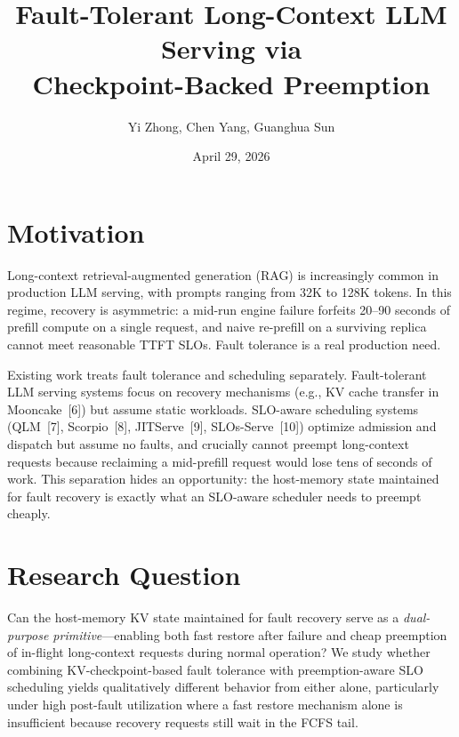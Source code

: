 \documentclass{article}
\title{Fault-Tolerant Long-Context LLM Serving via\\Checkpoint-Backed Preemption}
\author{Yi Zhong, Chen Yang, Guanghua Sun}
\date{April 29, 2026}
\begin{document}
\maketitle

\section*{Motivation}
Long-context retrieval-augmented generation (RAG) is increasingly common in production LLM serving, with prompts ranging from 32K to 128K tokens. In this regime, recovery is asymmetric: a mid-run engine failure forfeits 20--90 seconds of prefill compute on a single request, and naive re-prefill on a surviving replica cannot meet reasonable TTFT SLOs. Fault tolerance is a real production need.

Existing work treats fault tolerance and scheduling separately. Fault-tolerant LLM serving systems focus on recovery mechanisms (e.g., KV cache transfer in Mooncake~[6]) but assume static workloads. SLO-aware scheduling systems (QLM~[7], Scorpio~[8], JITServe~[9], SLOs-Serve~[10]) optimize admission and dispatch but assume no faults, and crucially cannot preempt long-context requests because reclaiming a mid-prefill request would lose tens of seconds of work. This separation hides an opportunity: the host-memory state maintained for fault recovery is exactly what an SLO-aware scheduler needs to preempt cheaply.

\section*{Research Question}
Can the host-memory KV state maintained for fault recovery serve as a \emph{dual-purpose primitive}---enabling both fast restore after failure and cheap preemption of in-flight long-context requests during normal operation? We study whether combining KV-checkpoint-based fault tolerance with preemption-aware SLO scheduling yields qualitatively different behavior from either alone, particularly under high post-fault utilization where a fast restore mechanism alone is insufficient because recovery requests still wait in the FCFS tail.
\end{document}
